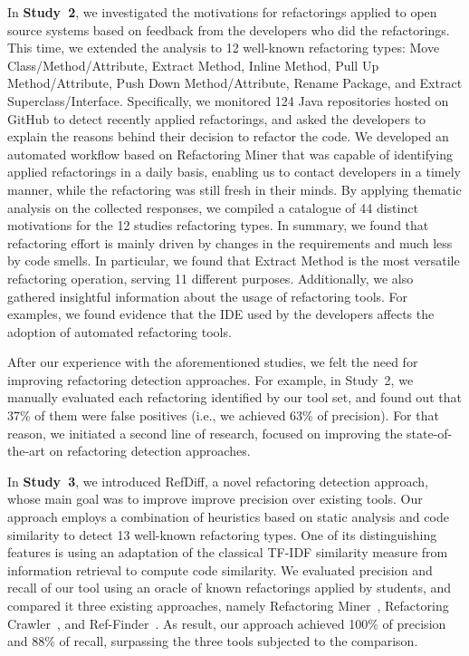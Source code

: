 In \textbf{Study~2}, we investigated the motivations for refactorings applied to open source systems based on feedback from the developers who did the refactorings.
This time, we extended the analysis to 12 well-known refactoring types: Move Class/Method/Attribute, Extract Method, Inline Method, Pull Up Method/Attribute, Push Down Method/Attribute, Rename Package, and Extract Superclass/Interface.
Specifically, we monitored 124 Java repositories hosted on GitHub to detect recently applied refactorings, and asked the developers to explain the reasons behind their decision to refactor the code.
We developed an automated workflow based on Refactoring Miner that was capable of identifying applied refactorings in a daily basis, enabling us to contact developers in a timely manner, while the refactoring was still fresh in their minds.
By applying thematic analysis on the collected responses, we compiled a catalogue of 44 distinct motivations for the 12 studies refactoring types.
In summary, we found that refactoring effort is mainly driven by changes in the requirements and much less by code smells.
In particular, we found that Extract Method is the most versatile refactoring operation, serving 11 different purposes.
Additionally, we also gathered insightful information about the usage of refactoring tools. For examples, we found evidence that the IDE used by the developers affects the adoption of automated refactoring tools.


After our experience with the aforementioned studies, we felt the need for improving refactoring detection approaches.
For example, in Study~2, we manually evaluated each refactoring identified by our tool set, and found out that 37\% of them were false positives (i.e., we achieved 63\% of precision).
For that reason, we initiated a second line of research, focused on improving the state-of-the-art on refactoring detection approaches.

In \textbf{Study~3}, we introduced RefDiff, a novel refactoring detection approach, whose main goal was to improve improve precision over existing tools.
Our approach employs a combination of heuristics based on static analysis and code
similarity to detect 13 well-known refactoring types.
One of its distinguishing features is using an adaptation of the classical TF-IDF similarity measure from information retrieval to compute code similarity.
We evaluated precision and recall of our tool using an oracle of known refactorings applied by students, and compared it three existing approaches, namely Refactoring Miner~\citep{tsantalis_empiricalstudy}, Refactoring Crawler~\citep{dig2006automated}, and Ref-Finder~\citep{Kim:2010:RefFinder}.
As result, our approach achieved 100\% of precision and 88\% of recall, surpassing the three tools subjected to the comparison.

